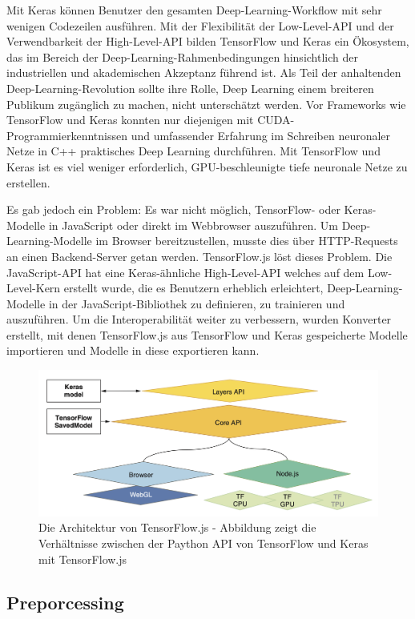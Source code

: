 Mit Keras können Benutzer den gesamten Deep-Learning-Workflow mit sehr wenigen Codezeilen ausführen. Mit der Flexibilität der Low-Level-API und der Verwendbarkeit der High-Level-API bilden TensorFlow und Keras ein Ökosystem, das im Bereich der Deep-Learning-Rahmenbedingungen hinsichtlich der industriellen und akademischen Akzeptanz führend ist. Als Teil der anhaltenden Deep-Learning-Revolution sollte ihre Rolle, Deep Learning einem breiteren Publikum zugänglich zu machen, nicht unterschätzt werden. Vor Frameworks wie TensorFlow und Keras konnten nur diejenigen mit CUDA-Programmierkenntnissen und umfassender Erfahrung im Schreiben neuronaler Netze in C++ praktisches Deep Learning durchführen. Mit TensorFlow und Keras ist es viel weniger erforderlich, GPU-beschleunigte tiefe neuronale Netze zu erstellen.

Es gab jedoch ein Problem: Es war nicht möglich, TensorFlow- oder Keras-Modelle in JavaScript oder direkt im Webbrowser auszuführen. Um Deep-Learning-Modelle im Browser bereitzustellen, musste dies über HTTP-Requests an einen Backend-Server getan werden. TensorFlow.js löst dieses Problem. Die JavaScript-API hat eine Keras-ähnliche High-Level-API welches auf dem Low-Level-Kern erstellt wurde, die es Benutzern erheblich erleichtert, Deep-Learning-Modelle in der JavaScript-Bibliothek zu definieren, zu trainieren und auszuführen. Um die Interoperabilität weiter zu verbessern, wurden Konverter erstellt, mit denen TensorFlow.js aus TensorFlow und Keras gespeicherte Modelle importieren und Modelle in diese exportieren kann.

 \begin{figure}[H]
     \centering
     \includegraphics[width=12cm]{kapitel5/tfjsarch.png}
     \caption[Die Architektur von TensorFlow.js]{Die Architektur von TensorFlow.js - Abbildung zeigt die Verhältnisse zwischen der Paython API von TensorFlow und Keras mit TensorFlow.js}
     \label{Kap5:tfjsarch}
 \end{figure}

\subsection{Preporcessing}
